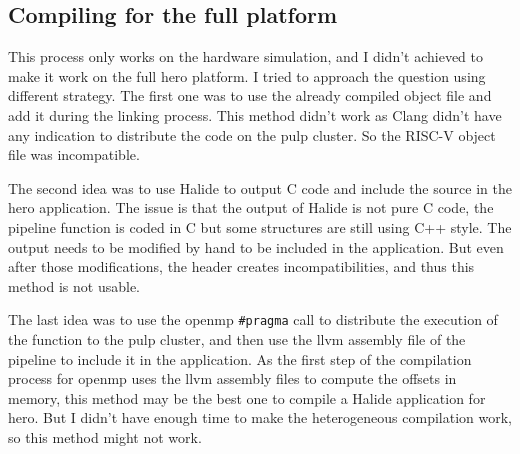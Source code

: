     \subsection{Compiling for the  full platform}
    This process only works on the hardware simulation, and I didn't achieved to make it work on the full \gls{hero} platform.
    I tried to approach the question using different strategy. The first one was to use the already compiled object file and add it during the linking process. This method didn't work as Clang didn't have any indication to distribute the code on the \gls{pulp} cluster. So the RISC-V object file was incompatible.

    The second idea was to use Halide to output C code and include the source in the \gls{hero} application. The issue is that the output of Halide is not pure C code, the pipeline function is coded in C but some structures are still using C++ style. The output needs to be modified by hand to be included in the application. But even after those modifications, the header creates incompatibilities, and thus this method is not usable.

    The last idea was to use the \gls{openmp} \texttt{\#pragma} call to distribute the execution of the function to the \gls{pulp} cluster, and then use the \gls{llvm} assembly file of the pipeline to include it in the application.
    As the first step of the compilation process for \gls{openmp} uses the \gls{llvm} assembly files to compute the offsets in memory, this method may be the best one to compile a Halide application for \gls{hero}.
    But I didn't have enough time to make the heterogeneous compilation work, so this method might not work.
